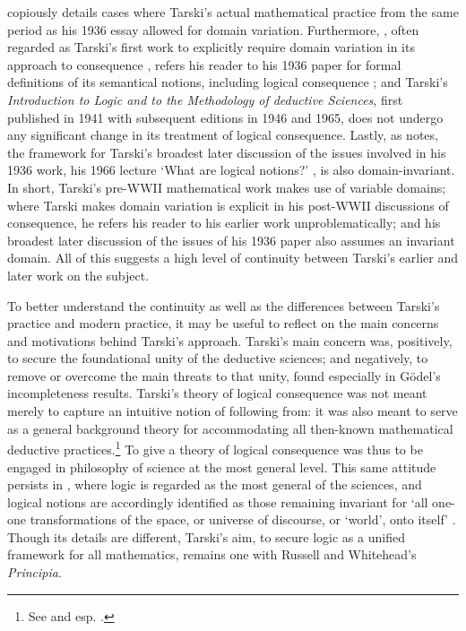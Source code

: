 \documentclass[]{article}
\begin{document}
\cite[251-267]{Gomez-Torrente2009} copiously details cases where Tarski's actual mathematical practice from the same period as his 1936 essay allowed for domain variation. Furthermore, \cite{Tarski1953a}, often regarded as Tarski's first work to explicitly require domain variation in its approach to consequence \cite[367]{Corcoran2011} \cite[65]{Etchemendy1988}, refers his reader to his 1936 paper for formal definitions of its semantical notions, including logical consequence \cite[8, n. 7]{Tarski1953a} \cite[259]{Gomez-Torrente2009}; and Tarski's  \textit{Introduction to Logic and to the Methodology of deductive Sciences}, first published in 1941 with subsequent editions in 1946 and 1965, does not undergo any significant change in its treatment of logical consequence. Lastly, as \cite[365-366]{Corcoran2011} notes, the framework for Tarski's broadest later discussion of the issues involved in his 1936 work, his 1966 lecture `What are logical notions?' \cite{Tarski1986}, is also domain-invariant. In short, Tarski's pre-WWII mathematical work makes use of variable domains; where Tarski makes domain variation is explicit in his post-WWII discussions of consequence, he refers his reader to his earlier work unproblematically; and his broadest later discussion of the issues of his 1936 paper also assumes an invariant domain. All of this suggests a high level of continuity between Tarski's earlier and later work on the subject.

To better understand the continuity as well as the differences between Tarski's practice and modern practice, it may be useful to reflect on the main concerns and motivations behind Tarski's approach. Tarski's main concern was, positively, to secure the foundational unity of the deductive sciences; and negatively, to remove or overcome the main threats to that unity, found especially in G\"{o}del's incompleteness results. Tarski's theory of logical consequence was not meant merely to capture an intuitive notion of following from: it was also meant to serve as a general background theory for accommodating all then-known mathematical deductive practices.\footnote{See \cite{Blok1988} and esp. \cite{Jane2006}.} To give a theory of logical consequence was thus to be engaged in philosophy of science at the most general level. This same attitude persists in \cite{Tarski1986}, where logic is regarded as the most general of the sciences, and logical notions are accordingly identified as those remaining invariant for `all one-one transformations of the space, or universe of discourse, or `world', onto itself' \cite[49]{Tarski1986}. Though its details are different, Tarski's aim, to secure logic as a unified framework for all mathematics, remains one with Russell and Whitehead's \textit{Principia}.
\end{document}
